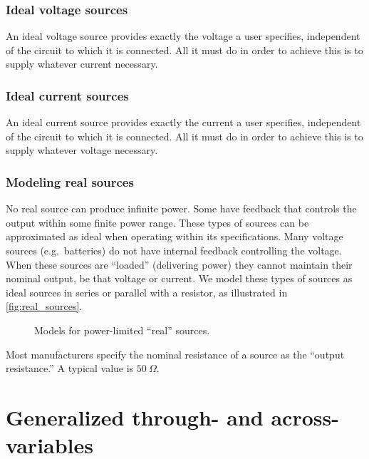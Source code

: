 \documentclass[dynamic_systems.tex]{subfiles}
\begin{document}
\subsubsection{Ideal voltage sources}

An ideal voltage source provides exactly the voltage a user specifies, independent of the circuit to which it is connected.
All it must do in order to achieve this is to supply whatever current necessary.

\subsubsection{Ideal current sources}

An ideal current source provides exactly the current a user specifies, independent of the circuit to which it is connected.
All it must do in order to achieve this is to supply whatever voltage necessary.
\tags{}

\subsubsection{Modeling real sources}
\tags{}

No real source can produce infinite power.
Some have feedback that controls the output within some finite power range.
These types of sources can be approximated as ideal when operating within its specifications.
Many voltage sources (e.g.\ batteries) do not have internal feedback controlling the voltage.
When these sources are ``loaded'' (delivering power) they cannot maintain their nominal output, be that voltage or current.
We model these types of sources as ideal sources in series or parallel with a resistor, as illustrated in \autoref{fig:real_sources}.

\begin{figure}[b]%
  \centering
  \qquad
  \caption{Models for power-limited ``real'' sources.}%
  \label{fig:real_sources}%
\end{figure}

Most manufacturers specify the nominal resistance of a source as the ``output resistance.''
A typical value is $50\ \Omega$.

\section{Generalized through- and across-variables}
\tags{}
\end{document}

